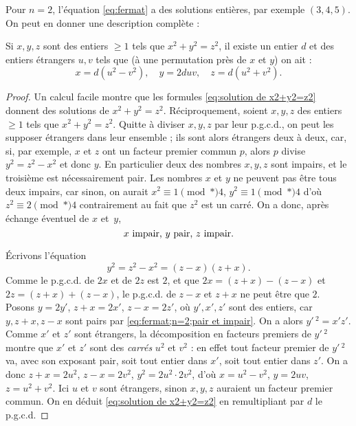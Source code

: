 \documentclass[11pt, useosf,
  title in boldface,
  theorem in new line,
  theorem numbering = section,
  number theorems separately,
]{simplivre}
\begin{document}
    Pour \( n = 2 \), l'équation \eqref{eq:fermat} a des solutions entières, par exemple \( (3,4,5) \). On peut en donner une description complète :

    \begin{theorem}\label{thm:eq.fermat;n=2}
        Si \( x,y,z \) sont des entiers \( \geqslant 1 \) tels que \( x^2+y^2=z^2 \), il existe un entier \( d \) et des entiers étrangers \( u,v \) tels que (à une permutation près de \( x \) et \( y \)) on ait :
        \begin{equation}\label{eq:solution de x2+y2=z2}
            x = d(u^2-v^2), \quad
            y = 2duv, \quad
            z = d(u^2+v^2).
        \end{equation}
    \end{theorem}
    \begin{proof}
        Un calcul facile montre que les formules \eqref{eq:solution de x2+y2=z2} donnent des solutions de \( x^2+y^2=z^2 \). Réciproquement, soient \( x,y,z \) des entiers \( \geqslant 1 \) tels que \( x^2+y^2=z^2 \). Quitte à diviser \( x,y,z \) par leur p.g.c.d., on peut les supposer étrangers dans leur ensemble ; ils sont alors étrangers deux à deux, car, si, par exemple, \( x \) et \( z \) ont un facteur premier commun \( p \), alors \( p \) divise \( y^2 = z^2-x^2 \) et donc \( y \). En particulier deux des nombres \( x,y,z \) sont impairs, et le troisième est nécessairement pair. Les nombres \( x \) et \( y \) ne peuvent pas être tous deux impairs, car sinon, on aurait \( x^2 \equiv 1 \pmod*{4} \), \( y^2 \equiv 1 \pmod*{4} \) d'où \( z^2 \equiv 2 \pmod*{4} \) contrairement au fait que \( z^2 \) est un carré. On a donc, après échange éventuel de \( x \) et~\( y \),
        \begin{equation}\label{eq:fermat;n=2;pair et impair}
            \text{\( x \) impair, \( y \) pair, \( z \) impair.}
        \end{equation}

        Écrivons l'équation
        \begin{equation}
            y^2 = z^2-x^2 = (z-x)(z+x).
        \end{equation}
        Comme le p.g.c.d. de \( 2x \) et de \( 2z \) est \( 2 \), et que \( 2x = (z+x)-(z-x) \) et \( 2z = (z+x)+(z-x) \), le p.g.c.d. de \( z-x \) et \( z+x \) ne peut être que \( 2 \). Posons \( y = 2y' \), \( z+x = 2x' \), \( z-x = 2z' \), où \( y',x',z' \) sont des entiers, car \( y, z+x, z-x \) sont pairs par \eqref{eq:fermat;n=2;pair et impair}. On a alors \( y'\,^2=x'z' \). Comme \( x' \) et \( z' \) sont étrangers, la décomposition en facteurs premiers de \( y'\,^2 \) montre que \( x' \) et \( z' \) sont des \emph{carrés} \( u^2 \) et \( v^2 \) : en effet tout facteur premier de \( y'\,^2 \) va, avec son exposant pair, soit tout entier dans \( x' \), soit tout entier dans \( z' \). On a donc \( z+x = 2u^2 \), \( z-x = 2v^2 \), \( y^2 = 2u^2 \cdot 2v^2 \), d'où \( x = u^2-v^2 \), \( y = 2uv \), \( z = u^2+v^2 \). Ici \( u \) et \( v \) sont étrangers, sinon \( x,y,z \) auraient un facteur premier commun. On en déduit \eqref{eq:solution de x2+y2=z2} en remultipliant par \( d \) le p.g.c.d.
    \end{proof}
\end{document}
